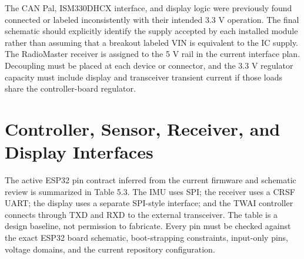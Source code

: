 The CAN Pal, ISM330DHCX interface, and display logic were previously
found connected or labeled inconsistently with their intended 3.3 V
operation. The final schematic should explicitly identify the supply
accepted by each installed module rather than assuming that a breakout
labeled VIN is equivalent to the IC supply. The RadioMaster receiver is
assigned to the 5 V rail in the current interface plan. Decoupling must
be placed at each device or connector, and the 3.3 V regulator capacity
must include display and transceiver transient current if those loads
share the controller-board regulator.

\section{Controller, Sensor, Receiver, and Display Interfaces}\label{controller-sensor-receiver-and-display-interfaces}

The active ESP32 pin contract inferred from the current firmware and
schematic review is summarized in Table 5.3. The IMU uses SPI; the
receiver uses a CRSF UART; the display uses a separate SPI-style
interface; and the TWAI controller connects through TXD and RXD to the
external transceiver. The table is a design baseline, not permission to
fabricate. Every pin must be checked against the exact ESP32 board
schematic, boot-strapping constraints, input-only pins, voltage domains,
and the current repository configuration.

